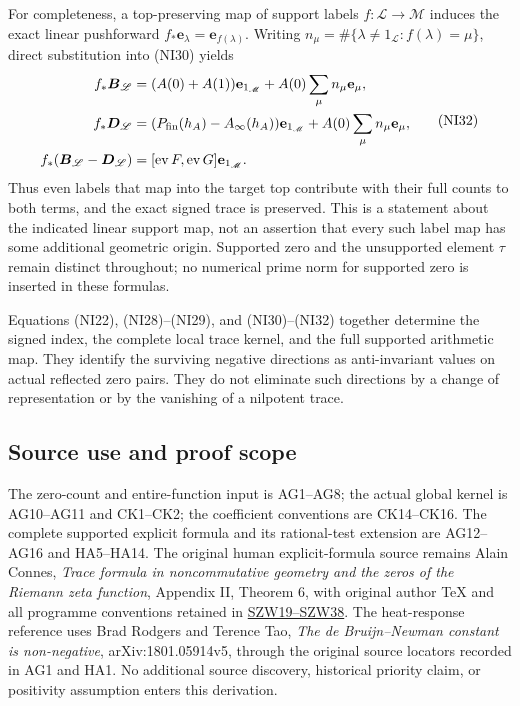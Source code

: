 \documentclass[
  10pt,
  a4paper,
]{article}
\begin{document}
For completeness, a top-preserving map of support labels
\(f:\mathscr L\to\mathscr M\) induces the exact linear pushforward
\(f_*\mathbf e_\lambda=\mathbf e_{f(\lambda)}\). Writing
\(n_\mu=\#\{\lambda\ne1_{\mathscr L}:f(\lambda)=\mu\}\), direct
substitution into (NI30) yields \[
\begin{split}
f_*\boldsymbol B_{\mathscr L}
&=(A(0)+A(1))\mathbf e_{1_{\mathscr M}}
+A(0)\sum_\mu n_\mu\mathbf e_\mu,\\
f_*\boldsymbol D_{\mathscr L}
&=(P_{\rm fin}(h_A)-A_\infty(h_A))\mathbf e_{1_{\mathscr M}}
+A(0)\sum_\mu n_\mu\mathbf e_\mu,\\
f_*(\boldsymbol B_{\mathscr L}-\boldsymbol D_{\mathscr L})
&=[\operatorname{ev}F,\operatorname{ev}G]\mathbf e_{1_{\mathscr M}}.
\end{split}
\tag{NI32}
\] Thus even labels that map into the target top contribute with their
full counts to both terms, and the exact signed trace is preserved. This
is a statement about the indicated linear support map, not an assertion
that every such label map has some additional geometric origin.
Supported zero and the unsupported element \(\tau\) remain distinct
throughout; no numerical prime norm for supported zero is inserted in
these formulas.

Equations (NI22), (NI28)--(NI29), and (NI30)--(NI32) together determine
the signed index, the complete local trace kernel, and the full
supported arithmetic map. They identify the surviving negative
directions as anti-invariant values on actual reflected zero pairs. They
do not eliminate such directions by a change of representation or by the
vanishing of a nilpotent trace.

\subsection{Source use and proof
scope}\label{source-use-and-proof-scope}

The zero-count and entire-function input is AG1--AG8; the actual global
kernel is AG10--AG11 and CK1--CK2; the coefficient conventions are
CK14--CK16. The complete supported explicit formula and its
rational-test extension are AG12--AG16 and HA5--HA14. The original human
explicit-formula source remains Alain Connes, \emph{Trace formula in
noncommutative geometry and the zeros of the Riemann zeta function},
Appendix II, Theorem 6, with original author TeX and all programme
conventions retained in
\href{https://github.com/KokunoYumeto/zeta-function-research-reader/blob/3c022a0adde0a6aa3d8fc8e43ef42795d88e44b0/workbenches/splitzero-tandem/branches/tau-zero-prime-positivity/SUPPORTED_ZERO_PRIME_WEIL_DERIVATION.md}{SZW19--SZW38}.
The heat-response reference uses Brad Rodgers and Terence Tao, \emph{The
de Bruijn--Newman constant is non-negative}, arXiv:1801.05914v5, through
the original source locators recorded in AG1 and HA1. No additional
source discovery, historical priority claim, or positivity assumption
enters this derivation.
\end{document}
